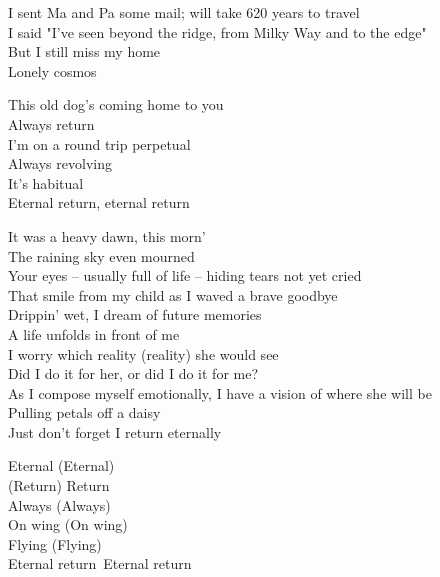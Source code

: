 
I sent Ma and Pa some mail; will take 620 years to travel \\
I said "I've seen beyond the ridge, from Milky Way and to the edge" \\
But I still miss my home \\
Lonely cosmos \\




This old dog's coming home to you \\
Always return \\
I'm on a round trip perpetual \\
Always revolving \\
It's habitual \\
Eternal return, eternal return \\


It was a heavy dawn, this morn' \\
The raining sky even mourned \\
Your eyes -- usually full of life -- hiding tears not yet cried \\
That smile from my child as I waved a brave goodbye \\
Drippin' wet, I dream of future memories \\
A life unfolds in front of me \\

I worry which reality (reality) she would see \\
Did I do it for her, or did I do it for me? \\
As I compose myself emotionally, I have a vision of where she will be \\
Pulling petals off a daisy \\
Just don't forget I return eternally \\


Eternal (Eternal) \\
(Return) Return \\
Always (Always) \\
On wing (On wing) \\
Flying (Flying) \\
Eternal return\
Eternal return \\

